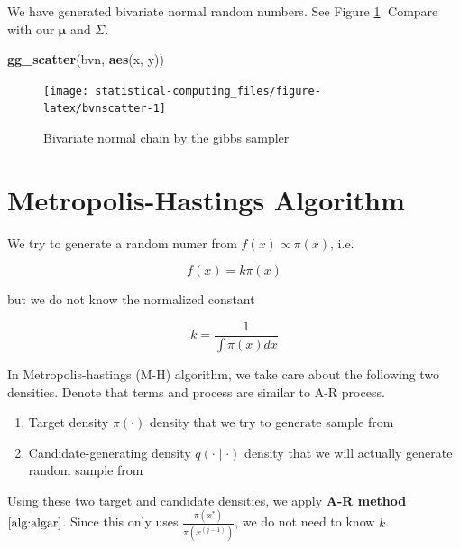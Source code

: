 \documentclass[]{book}
\newenvironment{Shaded}{\begin{snugshade}}{\end{snugshade}}
\newcommand{\KeywordTok}[1]{\textcolor[rgb]{0.13,0.29,0.53}{\textbf{#1}}}
\newcommand{\NormalTok}[1]{#1}
\theoremstyle{definition}
\theoremstyle{definition}
\theoremstyle{definition}
\theoremstyle{remark}
\let\BeginKnitrBlock\begin \let\EndKnitrBlock\end
\begin{document}
We have generated bivariate normal random numbers. See Figure \ref{fig:bvnscatter}. Compare with our \(\boldsymbol\mu\) and \(\Sigma\).

\begin{Shaded}
\begin{Highlighting}[]
\KeywordTok{gg_scatter}\NormalTok{(bvn, }\KeywordTok{aes}\NormalTok{(x, y))}
\end{Highlighting}
\end{Shaded}

\begin{figure}[H]

{\centering \texttt{[image: statistical-computing\_files/figure-latex/bvnscatter-1]} 

}

\caption{Bivariate normal chain by the gibbs sampler}\label{fig:bvnscatter}
\end{figure}

\hypertarget{metropolis-hastings-algorithm}{%
\section{Metropolis-Hastings Algorithm}\label{metropolis-hastings-algorithm}}

We try to generate a random numer from \(f(x) \propto \pi(x)\), i.e.

\[f(x) = k \pi(x)\]

but we do not know the normalized constant

\[k = \frac{1}{\int \pi(x) dx}\]

\BeginKnitrBlock{definition}[Density]
\protect\hypertarget{def:mcnote}{}{\label{def:mcnote} {} }In Metropolis-hastings (M-H) algorithm, we take care about the following two densities. Denote that terms and process are similar to A-R process.

\begin{enumerate}
  \item Target density $\pi(\cdot)$ density that we try to generate sample from
  \item Candidate-generating density $q(\cdot \mid \cdot)$ density that we will actually generate random sample from
\end{enumerate}
\EndKnitrBlock{definition}

Using these two target and candidate densities, we apply \textbf{A-R method} \(\ref{alg:algar}\). Since this only uses \(\frac{\pi(x^{\ast})}{\pi(x^{(j - 1)})}\), we do not need to know \(k\).
\end{document}
